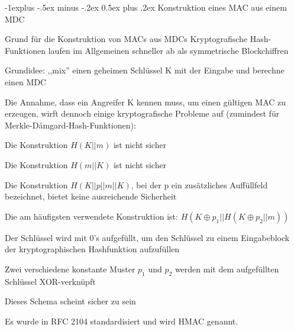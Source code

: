 \documentclass[a4paper]{article}
\makeatletter
\renewcommand{\subsection}{\@startsection{subsection}{2}{0mm}%
 {-1explus -.5ex minus -.2ex}%
 {0.5ex plus .2ex}%
 {\normalfont\normalsize\bfseries}}
\makeatother
\begin{document}
\begin{multicols}{3}
      \subsection{Konstruktion eines MAC aus einem MDC}
      \begin{itemize*}
            \item Grund für die Konstruktion von MACs aus MDCs Kryptografische Hash-Funktionen laufen im Allgemeinen schneller ab als symmetrische Blockchiffren
            \item Grundidee: ,,mix'' einen geheimen Schlüssel K mit der Eingabe und berechne einen MDC
            \item Die Annahme, dass ein Angreifer K kennen muss, um einen gültigen MAC zu erzeugen, wirft dennoch einige kryptografische Probleme auf (zumindest für Merkle-Dåmgard-Hash-Funktionen):
            \begin{itemize*}
                  \item Die Konstruktion $H(K|| m)$ ist nicht sicher
                  \item Die Konstruktion $H(m|| K)$ ist nicht sicher
                  \item Die Konstruktion $H(K|| p|| m|| K)$, bei der p ein zusätzliches Auffüllfeld bezeichnet, bietet keine ausreichende Sicherheit
            \end{itemize*}
            \item Die am häufigsten verwendete Konstruktion ist: $H(K\oplus p_1|| H(K\oplus p_2|| m))$
            \begin{itemize*}
                  \item Der Schlüssel wird mit 0's aufgefüllt, um den Schlüssel zu einem Eingabeblock der kryptographischen Hashfunktion aufzufüllen
                  \item Zwei verschiedene konstante Muster $p_1$ und $p_2$ werden mit dem aufgefüllten Schlüssel XOR-verknüpft
                  \item Dieses Schema scheint sicher zu sein
                  \item Es wurde in RFC 2104 standardisiert und wird HMAC genannt.
            \end{itemize*}
      \end{itemize*}


\end{multicols}
\end{document}
